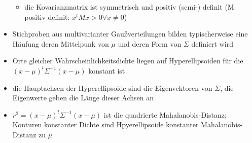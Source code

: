 \documentclass{article} %
\begin{document}
\begin{itemize}
\begin{itemize}
				\item die Kovarianzmatrix ist symmetrisch und positiv (semi-) definit (M positiv definit: $x^tMx>0 \forall x \neq0$)
			\end{itemize}
			\item Stichproben aus multivarianter Gaußverteilungen bilden typischerweise eine Häufung deren Mittelpunk von $\mu$ und deren Form von $\Sigma$ definiert wird
			\item Orte gleicher Wahrscheinlichkeitsdichte liegen auf Hyperellipsoiden für die $(x-\mu)^t\Sigma^{-1}(x-\mu)$ konstant ist
			\item die Hauptachsen der Hyperellipsoide sind die Eigenvektoren von $\Sigma$, die Eigenwerte geben die Länge dieser Achsen an
			\item $r^2 = (x-\mu)^t\Sigma^{-1}(x-\mu)$ ist die quadrierte Mahalanobis-Distanz; Konturen konstanter Dichte sind Hpyerellipsoide konstanter Mahalanobis-Distanz zu $\mu$
		\end{itemize}


\end{document}
